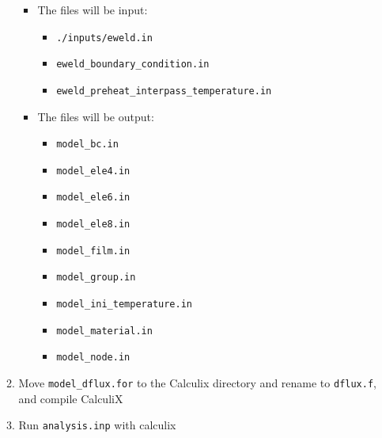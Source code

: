 \documentclass[12pt,letterpaper]{article}
\newcommand{\verbStyle}[1]{{\color{SteelBlue40}\colorbox{LightSteelBlue10}{{#1}}}}
\let\OldTexttt\texttt
\renewcommand{\texttt}[1]{\OldTexttt{\verbStyle{#1}}}
\begin{document}
\begin{itemize}
\begin{enumerate}
\begin{itemize}
\item The files will be input:
\begin{itemize}
\item \texttt{./inputs/eweld.in}
\item \texttt{eweld\_boundary\_condition.in}
\item \texttt{eweld\_preheat\_interpass\_temperature.in}
\end{itemize}
\item The files will be output:
\begin{itemize}
\item \texttt{model\_bc.in}
\item \texttt{model\_ele4.in}
\item \texttt{model\_ele6.in}
\item \texttt{model\_ele8.in}
\item \texttt{model\_film.in}
\item \texttt{model\_group.in}
\item \texttt{model\_ini\_temperature.in}
\item \texttt{model\_material.in}
\item \texttt{model\_node.in}
\end{itemize}
\end{itemize}
\item Move \texttt{model\_dflux.for} to the Calculix directory and rename to \texttt{dflux.f}, and compile CalculiX
\item Run \texttt{analysis.inp} with calculix
\end{enumerate}
\end{itemize}
\end{document}
